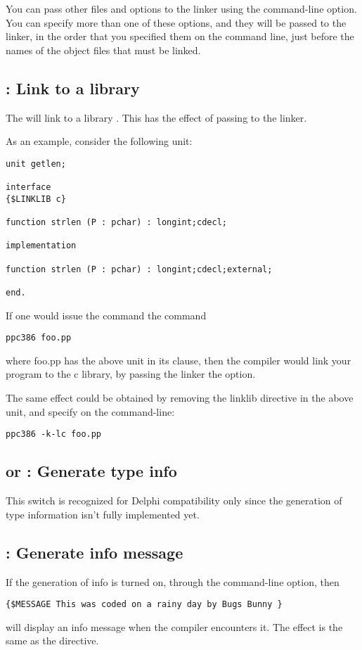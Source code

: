 \documentclass{report}
\begin{document}
You can pass other files and options to the linker using the 
command-line option. You can specify more than one of these options, and
they will be passed to the linker, in the order that you specified them on
the command line, just before the names of the object files that must be
linked.

\subsection{ : Link to a library}
The  will link to a library .
This has the effect of passing  to the linker. 

As an example, consider the following unit:
\begin{verbatim}
unit getlen;

interface
{$LINKLIB c}

function strlen (P : pchar) : longint;cdecl;

implementation

function strlen (P : pchar) : longint;cdecl;external;

end.
\end{verbatim}
If one would issue the command the command
\begin{verbatim}
ppc386 foo.pp
\end{verbatim}
where foo.pp has the above unit in its  clause, 
then the compiler would link your program to the c library, by passing the
linker the  option.

The same effect could be obtained by removing the linklib directive in the
above unit, and specify  on the command-line:
\begin{verbatim}
ppc386 -k-lc foo.pp
\end{verbatim}

\subsection{ or  : Generate type info}

This switch is recognized for Delphi compatibility only since the generation
of type information isn't fully implemented yet.

\subsection{ : Generate info message}

If the generation of info is turned on, through the  command-line
option, then 
\begin{verbatim}
{$MESSAGE This was coded on a rainy day by Bugs Bunny }
\end{verbatim}
will display an info message when the compiler encounters it. The effect is
the same as the  directive.
\end{document}
